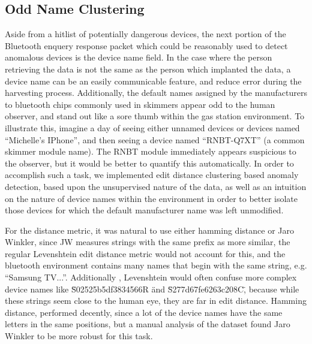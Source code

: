 \subsection{Odd Name Clustering}

Aside from a hitlist of potentially dangerous devices, the next portion of the Bluetooth enquery
response packet which could be reasonably used to detect anomalous devices is the device name
field. In the case where the person retrieving the data is not the same as the person which
implanted the data, a device name can be an easily communicable feature, and reduce error during
the harvesting process. Additionally, the default names assigned by the manufacturers to
bluetooth chips commonly used in skimmers appear odd to the human observer, and stand out like a
sore thumb within the gas station environment. To illustrate this, imagine a day of seeing either
unnamed devices or devices named ``Michelle's IPhone'', and then seeing a device named
``RNBT-Q7XT'' (a common skimmer module name). The RNBT module immediately appears suspicious to
the observer, but it would be better to quantify this automatically. In order to accomplish
such a task, we implemented edit distance clustering based anomaly detection, based upon
the unsupervised nature of the data, as well as an intuition on the nature of device names
within the environment in order to better isolate those devices for which the default
manufacturer name was left unmodified.

For the distance metric, it was natural to use either hamming distance or Jaro Winkler, since
JW measures strings with the same prefix as more similar, the regular Levenshtein
edit distance metric would not account for this, and the bluetooth environment contains
many names that begin with the same string, e.g. ``Samsung TV...''.  Additionally
, Levenshtein would often confuse more complex device names like \"S02525b5df3834566R
\" and \"S277d67fe6263c208C\", because while these strings seem close to the human
eye, they are far in edit distance. Hamming distance, performed decently, since a
lot of the device names have the same letters in the same positions, but a manual
analysis of the dataset found Jaro Winkler to be more robust for this task.

